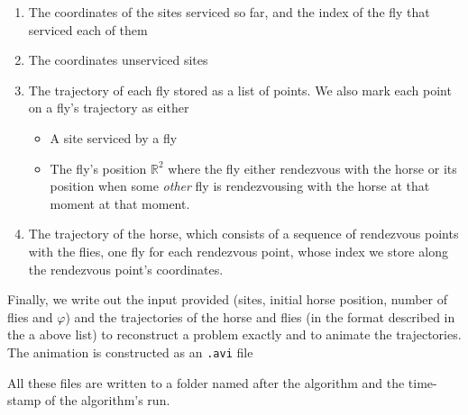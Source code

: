 \documentclass[11.5pt]{report}
\begin{document}
\begin{enumerate}
  \item The coordinates of the sites serviced so far, and the index of the fly that serviced each of them
  \item The coordinates unserviced sites
  \item The trajectory of each fly stored as a list of points. We also mark each point on a fly's trajectory as either 
      \begin{itemize}
          \item A site serviced by a fly
          \item The fly's position $\mathbb{R}^2$ where the fly either rendezvous 
                with the horse or its position when some \textit{other} fly is rendezvousing with the 
                horse at that moment at that moment.  
      \end{itemize}
  \item The trajectory of the horse, which consists of a sequence of rendezvous points with the flies, 
        one fly for each rendezvous point, whose index we store along the rendezvous point's coordinates. 
\end{enumerate}

Finally, we write out the input provided (sites, initial horse position, number of flies and $\varphi$) and 
the trajectories of the horse and flies (in the format described in the a above list) to reconstruct a 
problem exactly and to animate the trajectories. The animation is constructed as an \verb|.avi| file

All these files are written to a folder named after the
algorithm and the time-stamp of the algorithm's run. 
\end{document}
